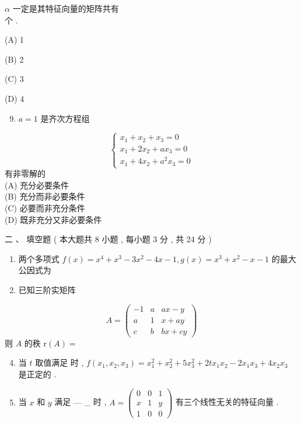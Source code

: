 \documentclass[10pt]{article}
\begin{document}
{\begin{enumerate}
\end{enumerate}
$\alpha$  一定是其特征向量的矩阵共有 \\
 个 .

(A) 1

(B) 2

(C) 3

(D) 4

\begin{enumerate}
  \setcounter{enumi}{8}
  \item $a=1$  是齐次方程组 
\end{enumerate}
$$
\left\{\begin{array}{l}
x_{1}+x_{2}+x_{3}=0 \\
x_{1}+2 x_{2}+a x_{3}=0 \\
x_{1}+4 x_{2}+a^{2} x_{3}=0
\end{array}\right.
$$
 有非零解的 \\
(A)  充分必要条件 \\
(B)  充分而非必要条件 \\
(C)  必要而非充分条件 \\
(D)  既非充分又非必要条件 

 二 、 填空题 ( 本大题共  8  小题 ,  每小题  3  分 ,  共  24  分 )

\begin{enumerate}
  \item  两个多项式  $f(x)=x^{4}+x^{3}-3 x^{2}-4 x-1, g(x)=x^{3}+x^{2}-x-1$  的最大公因式为 

  \item  已知三阶实矩阵 

\end{enumerate}
$$
A=\left(\begin{array}{ccc}
-1 & a & a x-y \\
a & 1 & x+a y \\
c & b & b x+c y
\end{array}\right)
$$
 则  $A$  的秩  $\mathrm{r}(A)=$

\begin{enumerate}
  \setcounter{enumi}{3}
  \item  当  $t$  取值满足   时 , $f\left(x_{1}, x_{2}, x_{3}\right)=x_{1}^{2}+x_{2}^{2}+5 x_{3}^{2}+2 t x_{1} x_{2}-2 x_{1} x_{3}+4 x_{2} x_{3}$  是正定的 .

  \item  当  $x$  和  $y$  满足  $—$ \_ 时 , $A=\left(\begin{array}{lll}0 & 0 & 1 \\ x & 1 & y \\ 1 & 0 & 0\end{array}\right)$  有三个线性无关的特征向量 .


\end{enumerate}}
\end{document}
